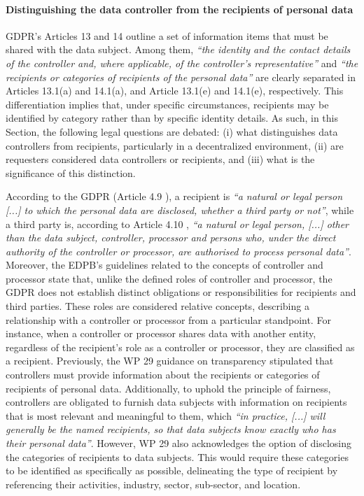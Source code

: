 \paragraph{Distinguishing the data controller from the recipients of personal data}

GDPR's Articles 13 and 14 \citeyearpar{noauthor_regulation_2016} outline a set of information items that must be shared with the data subject.
Among them, \textit{``the identity and the contact details of the controller and, where applicable, of the controller's representative''} and \textit{``the recipients or categories of recipients of the personal data''} are clearly separated in Articles 13.1(a) and 14.1(a), and Article 13.1(e) and 14.1(e), respectively.
This differentiation implies that, under specific circumstances, recipients may be identified by category rather than by specific identity details.
As such, in this Section, the following legal questions are debated: (i) what distinguishes data controllers from recipients, particularly in a decentralized environment, (ii) are requesters considered data controllers or recipients, and (iii) what is the significance of this distinction.

According to the GDPR (Article 4.9 \citeyearpar{noauthor_regulation_2016}), a recipient is \textit{``a natural or legal person [...] to which the personal data are disclosed, whether a third party or not''}, while a third party is, according to Article 4.10 \citeyearpar{noauthor_regulation_2016}, \textit{``a natural or legal person, [...] other than the data subject, controller, processor and persons who, under the direct authority of the controller or processor, are authorised to process personal data''}.
Moreover, the EDPB's guidelines related to the concepts of controller and processor \citep{european_data_protection_board_guidelines_cp_2020} state that, unlike the defined roles of controller and processor, the GDPR does not establish distinct obligations or responsibilities for recipients and third parties.
These roles are considered relative concepts, describing a relationship with a controller or processor from a particular standpoint.
For instance, when a controller or processor shares data with another entity, regardless of the recipient's role as a controller or processor, they are classified as a recipient.
Previously, the WP 29 guidance on transparency \citep{article_29_data_protection_working_party_guidelines_2018} stipulated that controllers must provide information about the recipients or categories of recipients of personal data.
Additionally, to uphold the principle of fairness, controllers are obligated to furnish data subjects with information on recipients that is most relevant and meaningful to them, which \textit{``in practice, [...] will generally be the named recipients, so that data subjects know exactly who has their personal data''}.
However, WP 29 also acknowledges the option of disclosing the categories of recipients to data subjects.
This would require these categories to be identified as specifically as possible, delineating the type of recipient by referencing their activities, industry, sector, sub-sector, and location.

